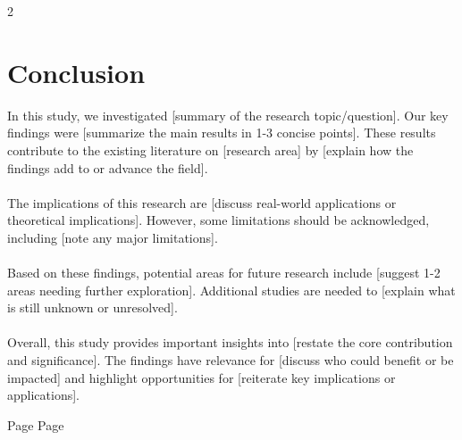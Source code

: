 \documentclass[9pt,a4paper,oneside]{extarticle}
\begin{document}
\begin{multicols*}{2}
\section*{Conclusion}
In this study, we investigated [summary of the research topic/question]. Our key findings were [summarize the main results in 1-3 concise points]. These results contribute to the existing literature on [research area] by [explain how the findings add to or advance the field].\\
\\
The implications of this research are [discuss real-world applications or theoretical implications]. However, some limitations should be acknowledged, including [note any major limitations].\\
\\
Based on these findings, potential areas for future research include [suggest 1-2 areas needing further exploration]. Additional studies are needed to [explain what is still unknown or unresolved].\\
\\
Overall, this study provides important insights into [restate the core contribution and significance]. The findings have relevance for [discuss who could benefit or be impacted] and highlight opportunities for [reiterate key implications or applications].

\printbibliography

\newpage
Page \thepage
\newpage
Page \thepage
\end{multicols*}
\end{document}
